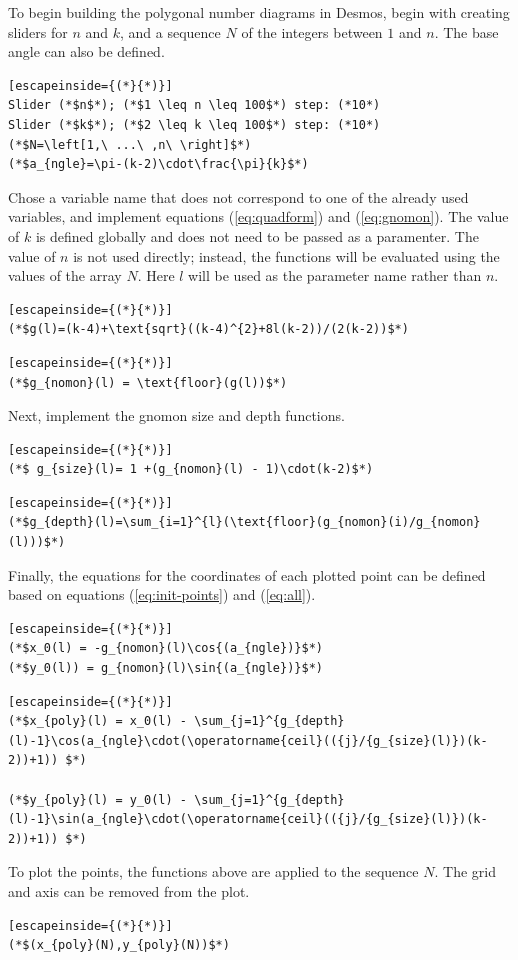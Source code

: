 \documentclass[notitlepage]{report}
\begin{document}
To begin building the polygonal number diagrams in Desmos, begin with creating sliders for $n$ and $k$, and a sequence $N$ of the integers between $1$ and $n$. The base angle can also be defined.

\begin{lstlisting}[escapeinside={(*}{*)}]
Slider (*$n$*); (*$1 \leq n \leq 100$*) step: (*10*)
Slider (*$k$*); (*$2 \leq k \leq 100$*) step: (*10*)
(*$N=\left[1,\ ...\ ,n\ \right]$*)
(*$a_{ngle}=\pi-(k-2)\cdot\frac{\pi}{k}$*)
\end{lstlisting}

Chose a variable name that does not correspond to one of the already used variables, and implement equations (\ref{eq:quadform}) and (\ref{eq:gnomon}). The value of $k$ is defined globally and does not need to be passed as a paramenter. The value of $n$ is not used directly; instead, the functions will be evaluated using the values of the array $N$. Here $l$ will be used as the parameter name rather than $n$. 

\begin{lstlisting}[escapeinside={(*}{*)}]
(*$g(l)=(k-4)+\text{sqrt}((k-4)^{2}+8l(k-2))/(2(k-2))$*)
\end{lstlisting}

\begin{lstlisting}[escapeinside={(*}{*)}]
(*$g_{nomon}(l) = \text{floor}(g(l))$*)  
\end{lstlisting}

Next, implement the gnomon size and depth functions.

\begin{lstlisting}[escapeinside={(*}{*)}]
(*$ g_{size}(l)= 1 +(g_{nomon}(l) - 1)\cdot(k-2)$*)
\end{lstlisting}

\begin{lstlisting}[escapeinside={(*}{*)}]
(*$g_{depth}(l)=\sum_{i=1}^{l}(\text{floor}(g_{nomon}(i)/g_{nomon}(l)))$*)
\end{lstlisting}

Finally, the equations for the coordinates of each plotted point can be defined based on equations (\ref{eq:init-points}) and (\ref{eq:all}).


\begin{lstlisting}[escapeinside={(*}{*)}]
(*$x_0(l) = -g_{nomon}(l)\cos{(a_{ngle})}$*)
(*$y_0(l)) = g_{nomon}(l)\sin{(a_{ngle})}$*)
\end{lstlisting}


\begin{lstlisting}[escapeinside={(*}{*)}]
(*$x_{poly}(l) = x_0(l) - \sum_{j=1}^{g_{depth}(l)-1}\cos(a_{ngle}\cdot(\operatorname{ceil}(({j}/{g_{size}(l)})(k-2))+1)) $*)

(*$y_{poly}(l) = y_0(l) - \sum_{j=1}^{g_{depth}(l)-1}\sin(a_{ngle}\cdot(\operatorname{ceil}(({j}/{g_{size}(l)})(k-2))+1)) $*)
\end{lstlisting}

To plot the points, the functions above are applied to the sequence $N$. The grid and axis can be removed from the plot.

\begin{lstlisting}[escapeinside={(*}{*)}]
(*$(x_{poly}(N),y_{poly}(N))$*)
\end{lstlisting}
\end{document}
